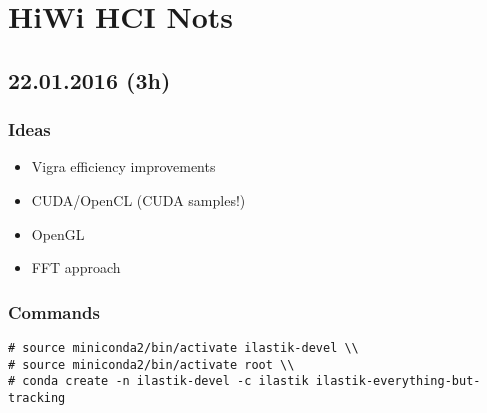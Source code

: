 \documentclass[12pt,a4paper]{article}
\begin{document}
\setlength{\parindent}{0pt}


\section*{HiWi HCI Nots}

\subsection*{22.01.2016 (3h)}

\subsubsection*{Ideas}
\begin{itemize}
  \item Vigra efficiency improvements
  \item CUDA/OpenCL (CUDA samples!)
  \item OpenGL
  \item FFT approach
\end{itemize}

\subsubsection*{Commands}

\begin{lstlisting}[style=BashInputStyle]
# source miniconda2/bin/activate ilastik-devel \\
# source miniconda2/bin/activate root \\
# conda create -n ilastik-devel -c ilastik ilastik-everything-but-tracking
\end{lstlisting}
\end{document}
